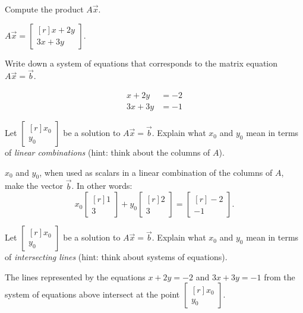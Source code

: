 \documentclass{problemset}
\newcommand{\mat}[1]{\begin{bmatrix*}[r]#1\end{bmatrix*}}
\begin{document}
	\begin{parts}
		\item Compute the product $A\vec x$.
			\begin{solution}
				$A \vec x = \mat{x+2y\\3x+3y}$.
			\end{solution}
		\item Write down a system of equations that corresponds to the matrix equation
			$A\vec x=\vec b$.
			\begin{solution}
				\begin{align*}
					x + 2y &= -2 \\
					3x + 3y &= -1
				\end{align*}
			\end{solution}
		\item Let $\mat{x_0\\y_0}$ be a solution to $A\vec x=\vec b$. Explain what
			$x_0$ and $y_0$ mean in terms of \emph{linear combinations} (hint: think
			about the columns of $A$).
			\begin{solution}
				$x_0$ and $y_0$, when used as scalars in a linear combination of
				the columns of $A$, make the vector $\vec b$. In other words:
				\[
					x_0 \mat{1\\3} + y_0 \mat{2\\3} = \mat{-2\\-1}.
				\]
			\end{solution}
		\item Let $\mat{x_0\\y_0}$ be a solution to $A\vec x=\vec b$. Explain what
			$x_0$ and $y_0$ mean in terms of \emph{intersecting lines} (hint: think
			about systems of equations).
			\begin{solution}
				The lines represented by the equations $x+2y=-2$ and $3x+3y=-1$
				from the system of equations above intersect at the point $\mat{x_0\\y_0}$.
			\end{solution}
	\end{parts}
\end{document}
